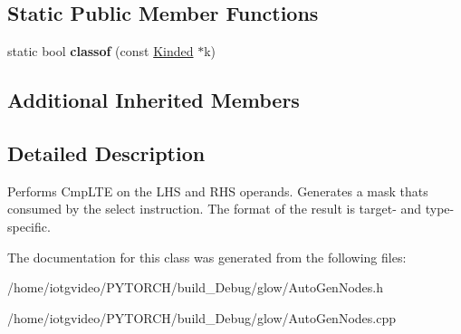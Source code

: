 \subsection*{Static Public Member Functions}
\begin{DoxyCompactItemize}
\item 
\mbox{\label{classglow_1_1_cmp_l_t_e_node_ac7407294599253376ea3ec424feeac83}} 
static bool {\bfseries classof} (const \hyperlink{classglow_1_1_kinded}{Kinded} $\ast$k)
\end{DoxyCompactItemize}
\subsection*{Additional Inherited Members}


\subsection{Detailed Description}
Performs Cmp\+L\+TE on the L\+HS and R\+HS operands. Generates a mask that\textquotesingle{}s consumed by the select instruction. The format of the result is target-\/ and type-\/specific. 

The documentation for this class was generated from the following files\+:\begin{DoxyCompactItemize}
\item 
/home/iotgvideo/\+P\+Y\+T\+O\+R\+C\+H/build\+\_\+\+Debug/glow/Auto\+Gen\+Nodes.\+h\item 
/home/iotgvideo/\+P\+Y\+T\+O\+R\+C\+H/build\+\_\+\+Debug/glow/Auto\+Gen\+Nodes.\+cpp\end{DoxyCompactItemize}
